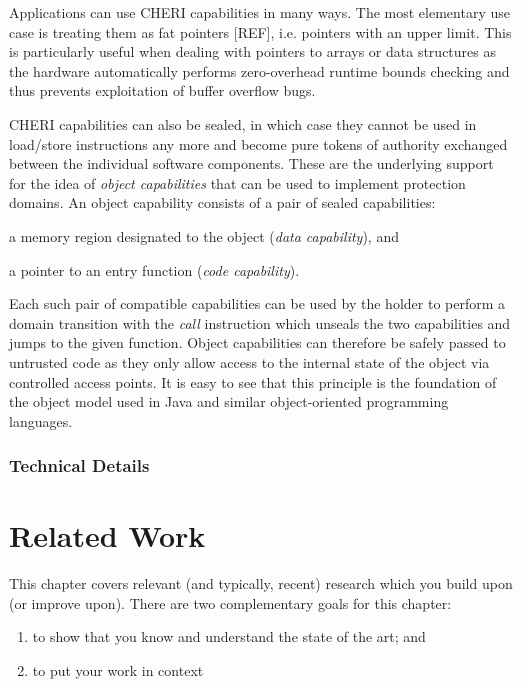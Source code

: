 \documentclass[a4paper,12pt,twoside,openright]{report}
\begin{document}
Applications can use CHERI capabilities in many ways. The most elementary use case is treating them as fat pointers [REF], i.e. pointers with an upper limit. This is particularly useful when dealing with pointers to arrays or data structures as the hardware automatically performs zero-overhead runtime bounds checking and thus prevents exploitation of buffer overflow bugs. 

CHERI capabilities can also be sealed, in which case they cannot be used in load/store instructions any more and become pure tokens of authority exchanged between the individual software components. These are the underlying support for the idea of \emph{object capabilities} that can be used to implement protection domains. An object capability consists of a pair of sealed capabilities: 
\begin{inparaenum}
\item a memory region designated to the object (\emph{data capability}), and
\item a pointer to an entry function (\emph{code capability}).
\end{inparaenum}
Each such pair of compatible capabilities can be used by the holder to perform a domain transition with the \emph{call} instruction which unseals the two capabilities and jumps to the given function. Object capabilities can therefore be safely passed to untrusted code as they only allow access to the internal state of the object via controlled access points. It is easy to see that this principle is the foundation of the object model used in Java and similar object-oriented programming languages.



\subsection{Technical Details}

\chapter{Related Work} 

This chapter covers relevant (and typically, recent) research 
which you build upon (or improve upon). There are two complementary 
goals for this chapter: 
\begin{enumerate} 
  \item to show that you know and understand the state of the art; and 
  \item to put your work in context
\end{enumerate} 
\end{document}
